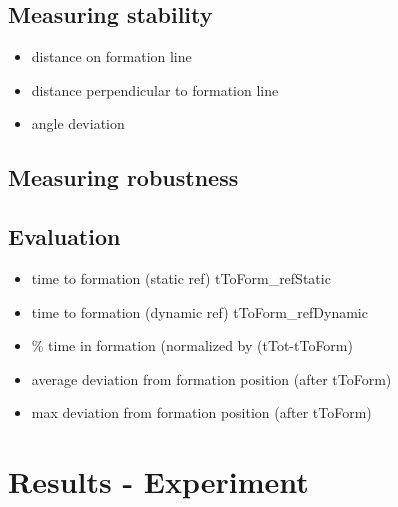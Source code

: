 \documentclass[a4paper, 12pt]{report}
\begin{document}
\subsection{Measuring stability}
\cite{Mataric2002}
\begin{itemize}
\item distance on formation line
\item distance perpendicular to formation line
\item angle deviation
\end{itemize}

\subsection{Measuring robustness}

\subsection{Evaluation}
\begin{itemize}
\item time to formation (static ref) tToForm\_refStatic
\item time to formation (dynamic ref) tToForm\_refDynamic
\item \% time in formation (normalized by (tTot-tToForm)
\item average deviation from formation position (after tToForm)
\item max deviation from formation position (after tToForm)

\end{itemize}

\cite{Arkin1999}
\cite{Mataric2002}

 

\newpage
\section{Results - Experiment}
\end{document}
